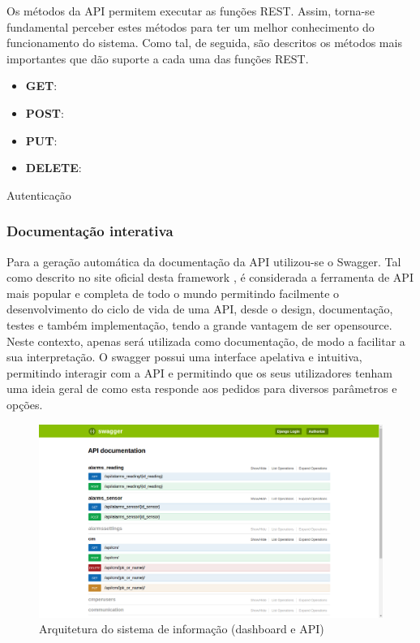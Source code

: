 Os métodos da API permitem executar as funções REST. Assim, torna-se fundamental perceber estes métodos para ter um melhor conhecimento do funcionamento do sistema. Como tal, de seguida, são descritos os métodos mais importantes que dão suporte a cada uma das funções REST.

\begin{itemize}
	\item \textbf{GET}: 
	\item \textbf{POST}: 
	\item \textbf{PUT}: 
	\item \textbf{DELETE}: 
\end{itemize}






Autenticação





\newpage
\subsubsection{Documentação interativa}


Para a geração automática da documentação da API utilizou-se o Swagger. Tal como descrito no site oficial desta framework \cite{SmartBearSoftware2017}, é considerada a ferramenta de API mais popular e completa de todo o mundo permitindo facilmente o desenvolvimento do ciclo de vida de uma API, desde o design, documentação, testes e também implementação, tendo a grande vantagem de ser opensource. Neste contexto, apenas será utilizada como documentação, de modo a facilitar a sua interpretação. O swagger possui uma interface apelativa e intuitiva, 
permitindo interagir com a API e permitindo que os seus utilizadores tenham uma ideia geral de como esta responde aos pedidos para diversos parâmetros e opções. 


\begin{figure}[h]
	\centering
	\includegraphics[width=\linewidth]{prints-web/api-doc.png}
	\caption{Arquitetura do sistema de informação (dashboard e API)}
	\label{docapi}
\end{figure}






